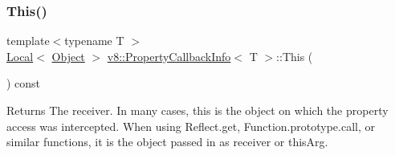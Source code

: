 \subsubsection{\texorpdfstring{This()}{This()}}
{\footnotesize\ttfamily template$<$typename T $>$ \\
\mbox{\hyperlink{classv8_1_1Local}{Local}}$<$ \mbox{\hyperlink{classv8_1_1Object}{Object}} $>$ \mbox{\hyperlink{classv8_1_1PropertyCallbackInfo}{v8\+::\+Property\+Callback\+Info}}$<$ T $>$\+::This (\begin{DoxyParamCaption}{ }\end{DoxyParamCaption}) const}

\begin{DoxyReturn}{Returns}
The receiver. In many cases, this is the object on which the property access was intercepted. When using {\ttfamily Reflect.\+get}, {\ttfamily Function.\+prototype.\+call}, or similar functions, it is the object passed in as receiver or this\+Arg.
\end{DoxyReturn}

